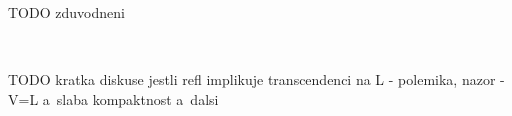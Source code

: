{\color{red}
\begin{comment}

TODO Plagiat -- prepsat a~vysvetlit
\begin{Fact}
The reflection -- constructed as explained in the previous paragraph (!!! preformulovat !!!) -- with second-order parameters for higher-order formulas (even of transfinite type) does not yield transcendence over $L$.
\end{Fact}

\end{comment}
}

TODO zduvodneni

\

TODO kratka diskuse jestli refl implikuje transcendenci na L - polemika, nazor - V=L a~slaba kompaktnost a~dalsi

\



